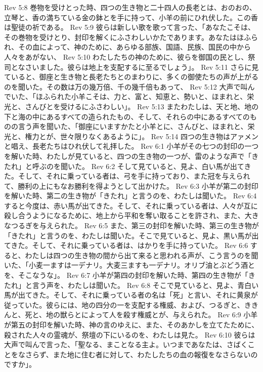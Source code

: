 Rev 5:8  巻物を受けとった時、四つの生き物と二十四人の長老とは、おのおの、立琴と、香の満ちている金の鉢とを手に持って、小羊の前にひれ伏した。この香は聖徒の祈である。
Rev 5:9  彼らは新しい歌を歌って言った、「あなたこそは、その巻物を受けとり、封印を解くにふさわしいかたであります。あなたはほふられ、その血によって、神のために、あらゆる部族、国語、民族、国民の中から人々をあがない、
Rev 5:10  わたしたちの神のために、彼らを御国の民とし、祭司となさいました。彼らは地上を支配するに至るでしょう」。
Rev 5:11  さらに見ていると、御座と生き物と長老たちとのまわりに、多くの御使たちの声が上がるのを聞いた。その数は万の幾万倍、千の幾千倍もあって、
Rev 5:12  大声で叫んでいた、「ほふられた小羊こそは、力と、富と、知恵と、勢いと、ほまれと、栄光と、さんびとを受けるにふさわしい」。
Rev 5:13  またわたしは、天と地、地の下と海の中にあるすべての造られたもの、そして、それらの中にあるすべてのものの言う声を聞いた、「御座にいますかたと小羊とに、さんびと、ほまれと、栄光と、権力とが、世々限りなくあるように」。
Rev 5:14  四つの生き物はアァメンと唱え、長老たちはひれ伏して礼拝した。
Rev 6:1  小羊がその七つの封印の一つを解いた時、わたしが見ていると、四つの生き物の一つが、雷のような声で「きたれ」と呼ぶのを聞いた。
Rev 6:2  そして見ていると、見よ、白い馬が出てきた。そして、それに乗っている者は、弓を手に持っており、また冠を与えられて、勝利の上にもなお勝利を得ようとして出かけた。
Rev 6:3  小羊が第二の封印を解いた時、第二の生き物が「きたれ」と言うのを、わたしは聞いた。
Rev 6:4  すると今度は、赤い馬が出てきた。そして、それに乗っている者は、人々が互に殺し合うようになるために、地上から平和を奪い取ることを許され、また、大きなつるぎを与えられた。
Rev 6:5  また、第三の封印を解いた時、第三の生き物が「きたれ」と言うのを、わたしは聞いた。そこで見ていると、見よ、黒い馬が出てきた。そして、それに乗っている者は、はかりを手に持っていた。
Rev 6:6  すると、わたしは四つの生き物の間から出て来ると思われる声が、こう言うのを聞いた、「小麦一ますは一デナリ。大麦三ますも一デナリ。オリブ油とぶどう酒とを、そこなうな」。
Rev 6:7  小羊が第四の封印を解いた時、第四の生き物が「きたれ」と言う声を、わたしは聞いた。
Rev 6:8  そこで見ていると、見よ、青白い馬が出てきた。そして、それに乗っている者の名は「死」と言い、それに黄泉が従っていた。彼らには、地の四分の一を支配する権威、および、つるぎと、ききんと、死と、地の獣らとによって人を殺す権威とが、与えられた。
Rev 6:9  小羊が第五の封印を解いた時、神の言のゆえに、また、そのあかしを立てたために、殺された人々の霊魂が、祭壇の下にいるのを、わたしは見た。
Rev 6:10  彼らは大声で叫んで言った、「聖なる、まことなる主よ。いつまであなたは、さばくことをなさらず、また地に住む者に対して、わたしたちの血の報復をなさらないのですか」。
